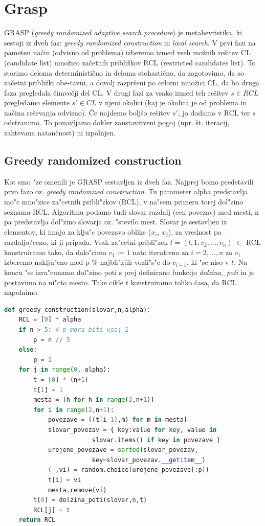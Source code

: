 \documentclass[12pt,a4paper]{amsart}
\theoremstyle{definition} %
\theoremstyle{plain} %
\begin{document}
\section{Grasp} 

GRASP (\textit{greedy randomized adaptive search procedure}) je metahevristika, ki sestoji iz dveh faz: \textit{greedy randomized construction} in \textit{local search}.
V prvi fazi na pameten način (odvisno od problema) izberemo izmed vseh možnih rešitev CL (candidate list) množico začetnih približkov RCL (restricted candidates list). 
To storimo deloma deterministično in deloma stohastično, da zagotovimo, da so začetni približki obe-tavni, a dovolj razpršeni po celotni množici CL, da bo druga faza pregledala čimvečji del CL. 
V drugi fazi za vsako izmed teh rešitev $ s \in  RCL $ pregledamo elemente $s' \in CL$ v njeni okolici (kaj je okolica je od problema in načina reševanja odvisno). Če najdemo boljšo rešitev $s'$, 
jo dodamo v RCL ter $s$ odstranimo. To ponavljamo dokler zaustavitveni pogoj (npr. št. iteracij, zahtevana natančnost) ni izpolnjen.

\subsection{Greedy randomized construction} 

Kot smo "ze omenili je GRASP sestavljen iz dveh faz. Najprej bomo predstavili prvo fazo oz. \textit{greedy randomized construction}.
Tu parameter alpha predstavlja mo"c mno"zice za"cetnih pribli"zkov (RCL), v na"sem primeru torej dol"zino seznama RCL. Algoritmu podamo tudi slovar razdalj (cen povezav) med mesti, n pa predstavlja dol"zino slovarja oz. "stevilo mest. Slovar je sestavljen iz elementov, ki imajo za klju"c povezavo oblike ($x_{i}$, $x_{j}$), za vrednost pa razdaljo/ceno, ki ji pripada.
Vsak za"cetni pribli"zek $t = (l,1,v_{2}, \dots,v_{n})$ $\in$ RCL konstruiramo tako, da dolo"cimo $ v_{1} := 1$ nato iterativno za $ i = 2, \dots,n$ za $v_{i}$ izberemo naklju"cno med p \% najbli"zjih vozli"s"c do $v_{i-1}$, ki "se niso v $t$. Na koncu "se izra"cunamo dol"zino poti s prej definirano funkcijo \textit{dolzina\_poti} in jo postavimo na ni"cto mesto. Take cikle $t$ konstruiramo toliko časa, da RCL napolnimo.   


\begin{lstlisting}[language=Python]
def greedy_construction(slovar,n,alpha):
    RCL = [0] * alpha
    if n > 5: # p mora biti vsaj 1
        p = n // 5 
    else:
        p = 1
    for j in range(0, alpha):
        t = [0] * (n+1)
        t[1] = 1
        mesta = [h for h in range(2,n+1)] 
        for i in range(2,n+1):
            povezave = [(t[i-1],m) for m in mesta] 
            slovar_povezav = { key:value for key, value in 
						slovar.items() if key in povezave }
            urejene_povezave = sorted(slovar_povezav, 
						key=slovar_povezav.__getitem__)
            (_,vi) = random.choice(urejene_povezave[:p]) 
            t[i] = vi
            mesta.remove(vi) 
        t[0] = dolzina_poti(slovar,n,t) 
        RCL[j] = t 
    return RCL 
\end{lstlisting}
\end{document}
